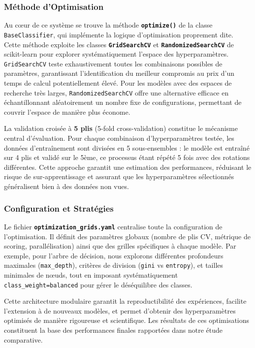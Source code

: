 \documentclass[11pt]{article}
\begin{document}
\subsubsection{Méthode d'Optimisation}\label{muxe9thode-doptimisation}

Au cœur de ce système se trouve la méthode \textbf{\texttt{optimize()}}
de la classe \texttt{BaseClassifier}, qui implémente la logique
d'optimisation proprement dite. Cette méthode exploite les classes
\textbf{\texttt{GridSearchCV}} et \textbf{\texttt{RandomizedSearchCV}}
de scikit-learn pour explorer systématiquement l'espace des
hyperparamètres. \texttt{GridSearchCV} teste exhaustivement toutes les
combinaisons possibles de paramètres, garantissant l'identification du
meilleur compromis au prix d'un temps de calcul potentiellement élevé.
Pour les modèles avec des espaces de recherche très larges,
\texttt{RandomizedSearchCV} offre une alternative efficace en
échantillonnant aléatoirement un nombre fixe de configurations,
permettant de couvrir l'espace de manière plus économe.

La validation croisée à \textbf{5 plis} (5-fold cross-validation)
constitue le mécanisme central d'évaluation. Pour chaque combinaison
d'hyperparamètres testée, les données d'entraînement sont divisées en 5
sous-ensembles : le modèle est entraîné sur 4 plis et validé sur le
5ème, ce processus étant répété 5 fois avec des rotations différentes.
Cette approche garantit une estimation des performances, réduisant le
risque de sur-apprentissage et assurant que les hyperparamètres
sélectionnés généralisent bien à des données non vues.

\subsubsection{Configuration et
  Stratégies}\label{configuration-et-stratuxe9gies}

Le fichier \textbf{\texttt{optimization\_grids.yaml}} centralise toute
la configuration de l'optimisation. Il définit des paramètres globaux
(nombre de plis CV, métrique de scoring, parallélisation) ainsi que des
grilles spécifiques à chaque modèle. Par exemple, pour l'arbre de
décision, nous explorons différentes profondeurs maximales
(\texttt{max\_depth}), critères de division (\texttt{gini} vs
\texttt{entropy}), et tailles minimales de nœuds, tout en imposant
systématiquement
\texttt{class\_weight=\textquotesingle{}balanced\textquotesingle{}} pour
gérer le déséquilibre des classes.

Cette architecture modulaire garantit la reproductibilité des
expériences, facilite l'extension à de nouveaux modèles, et permet
d'obtenir des hyperparamètres optimisés de manière rigoureuse et
scientifique. Les résultats de ces optimisations constituent la base des
performances finales rapportées dans notre étude comparative.
\end{document}
